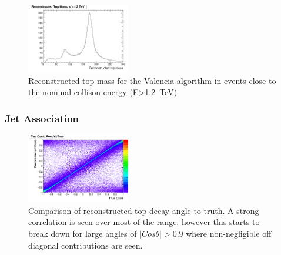 \begin{figure}
  \centering
  \includegraphics[width=0.4\textwidth]{TopAnalysis/figures/TopMass_EOver1200.png}
  \caption[Performance of Valencia algorithm for high energy events]{Reconstructed top mass for the Valencia algorithm in events close to the nominal collison energy (E>1.2~TeV)}
  \label{fig:highEValencia}
\end{figure}


\subsubsection{Jet Association}

\begin{figure}
  \centering
  \includegraphics[width=0.4\textwidth]{TopAnalysis/figures/CosThetaRecoVsMC.png}
  \caption[Comparison of reconstructed top decay angle to truth]{Comparison of reconstructed top decay angle to truth. A strong correlation is seen over most of the range, however this starts to break down for large angles of $\mid Cos\theta \mid>0.9$ where non-negligible off diagonal contributions are seen.}
  \label{fig:2djetangle}
\end{figure}

